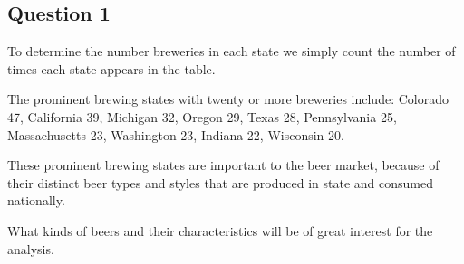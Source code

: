 \documentclass[]{article}
\begin{document}
\subsection{Question 1}\label{question-1}

To determine the number breweries in each state we simply count the
number of times each state appears in the table.

The prominent brewing states with twenty or more breweries include:
Colorado 47, California 39, Michigan 32, Oregon 29, Texas 28,
Pennsylvania 25, Massachusetts 23, Washington 23, Indiana 22, Wisconsin
20.

These prominent brewing states are important to the beer market, because
of their distinct beer types and styles that are produced in state and
consumed nationally.

What kinds of beers and their characteristics will be of great interest
for the analysis.
\end{document}
